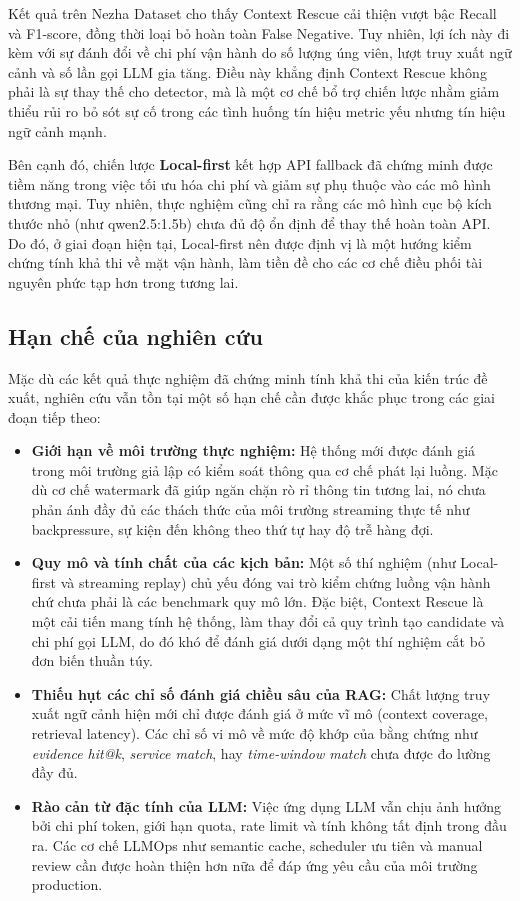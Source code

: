 Kết quả trên Nezha Dataset cho thấy Context Rescue cải thiện vượt bậc Recall và F1-score, đồng thời loại bỏ hoàn toàn False Negative. Tuy nhiên, lợi ích này đi kèm với sự đánh đổi về chi phí vận hành do số lượng úng viên, lượt truy xuất ngữ cảnh và số lần gọi LLM gia tăng. Điều này khẳng định Context Rescue không phải là sự thay thế cho detector, mà là một cơ chế bổ trợ chiến lược nhằm giảm thiểu rủi ro bỏ sót sự cố trong các tình huống tín hiệu metric yếu nhưng tín hiệu ngữ cảnh mạnh.

Bên cạnh đó, chiến lược \textbf{Local-first} kết hợp API fallback đã chứng minh được tiềm năng trong việc tối ưu hóa chi phí và giảm sự phụ thuộc vào các mô hình thương mại. Tuy nhiên, thực nghiệm cũng chỉ ra rằng các mô hình cục bộ kích thước nhỏ (như qwen2.5:1.5b) chưa đủ độ ổn định để thay thế hoàn toàn API. Do đó, ở giai đoạn hiện tại, Local-first nên được định vị là một hướng kiểm chứng tính khả thi về mặt vận hành, làm tiền đề cho các cơ chế điều phối tài nguyên phức tạp hơn trong tương lai.

\subsection{Hạn chế của nghiên cứu}

Mặc dù các kết quả thực nghiệm đã chứng minh tính khả thi của kiến trúc đề xuất, nghiên cứu vẫn tồn tại một số hạn chế cần được khắc phục trong các giai đoạn tiếp theo:

\begin{itemize}
    \item \textbf{Giới hạn về môi trường thực nghiệm:} Hệ thống mới được đánh giá trong môi trường giả lập có kiểm soát thông qua cơ chế phát lại luồng. Mặc dù cơ chế watermark đã giúp ngăn chặn rò rỉ thông tin tương lai, nó chưa phản ánh đầy đủ các thách thức của môi trường streaming thực tế như backpressure, sự kiện đến không theo thứ tự hay độ trễ hàng đợi.
    \item \textbf{Quy mô và tính chất của các kịch bản:} Một số thí nghiệm (như Local-first và streaming replay) chủ yếu đóng vai trò kiểm chứng luồng vận hành chứ chưa phải là các benchmark quy mô lớn. Đặc biệt, Context Rescue là một cải tiến mang tính hệ thống, làm thay đổi cả quy trình tạo candidate và chi phí gọi LLM, do đó khó để đánh giá dưới dạng một thí nghiệm cắt bỏ đơn biến thuần túy.
    \item \textbf{Thiếu hụt các chỉ số đánh giá chiều sâu của RAG:} Chất lượng truy xuất ngữ cảnh hiện mới chỉ được đánh giá ở mức vĩ mô (context coverage, retrieval latency). Các chỉ số vi mô về mức độ khớp của bằng chứng  như \textit{evidence hit@k}, \textit{service match}, hay \textit{time-window match} chưa được đo lường đầy đủ.
    \item \textbf{Rào cản từ đặc tính của LLM:} Việc ứng dụng LLM vẫn chịu ảnh hưởng bởi chi phí token, giới hạn quota, rate limit và tính không tất định trong đầu ra. Các cơ chế LLMOps như semantic cache, scheduler ưu tiên và manual review cần được hoàn thiện hơn nữa để đáp ứng yêu cầu của môi trường production.
\end{itemize}

